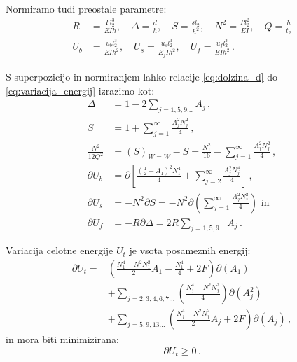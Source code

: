        Normiramo tudi preostale parametre:
        \begin{equation}\label{eq:normalizacija}
            \begin{aligned}
            R &=\frac{F l_2^3}{E I h}, \quad \Delta=\frac{d}{h}, \quad S=\frac{s l_2}{h^2}, \quad N^2=\frac{P l_2^2}{E I}, \quad Q=\frac{h}{t_2} \\
            U_b &=\frac{u_b l_2^3}{E I h^2}, \quad U_s=\frac{u_s l_2^3}{E_j I h^2}, \quad U_f=\frac{u_f l_2^3}{E I h^2} \,.
            \end{aligned}
        \end{equation}
        
        S superpozicijo in normiranjem lahko relacije \eqref{eq:dolzina_d} do \eqref{eq:variacija_energij} izrazimo kot:
        \begin{equation}
            \begin{aligned}
            \Delta &=1-2 \sum_{j=1, 5, 9 \ldots} A_j \,, \\
            S &=1+\sum_{j=1}^{\infty} \frac{A_j^2 N_j^2}{4} \,, \\
            \frac{N^2}{12 Q^2} &=(S)_{W=\bar{W}}-S=\frac{N_1^2}{16}-\sum_{j=1}^{\infty} \frac{A_j^2 N_j^2}{4} \, ,\\
            \partial U_b &=\partial\left[\frac{\left(\frac{1}{2}-A_1\right)^2 N_1^4}{4}+\sum_{j=2}^{\infty} \frac{A_j^2 N_j^4}{4}\right] \,, \\
            \partial U_s &=-N^2 \partial S = -N^2 \partial\left(\sum_{j=1}^{\infty} \frac{A_j^2 N_j^2}{4}\right) \text{ in} \\
            \partial U_f &=-R \partial\Delta=2 R \sum_{j=1, 5, 9 \ldots} A_j \,.
            \end{aligned}
        \end{equation}
        
        Variacija celotne energije $U_t$ je vsota posameznih energij:
        \begin{equation}
            \begin{aligned}
            \partial U_t =&\left(\frac{N_1^4-N^2 N_1^2}{2} A_1-\frac{N_1^4}{4}+2 F\right) \partial\left(A_1\right) \\
            &+\sum_{j=2,3,4,6,7 \ldots}\left(\frac{N_j^4-N^2 N_j^2}{4}\right) \partial\left(A_j^2\right) \\
            &+\sum_{j=5,9,13 \ldots}\left(\frac{N_j^4-N^2 N_j^2}{2} A_j+2 F\right) \partial\left(A_j\right) \,,
            \end{aligned}
        \end{equation} 
        in mora biti minimizirana:
        \begin{equation}\label{eq:minimizacija_Ut}
            \partial U_t \geq 0 \,.
        \end{equation}
        
